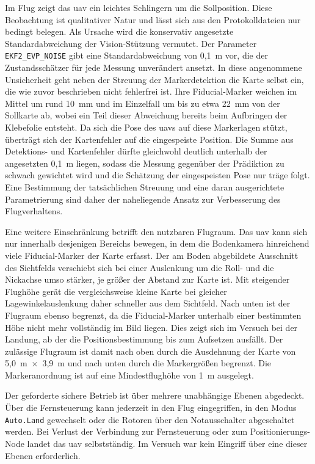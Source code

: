Im Flug zeigt das \gls{uav} ein leichtes Schlingern um die Sollposition.
Diese Beobachtung ist qualitativer Natur und lässt sich aus den Protokolldateien nur bedingt belegen.
Als Ursache wird die konservativ angesetzte Standardabweichung der Vision-Stützung vermutet.
Der Parameter \texttt{EKF2\_EVP\_NOISE} gibt eine Standardabweichung von 0,1~m vor, die der Zustandsschätzer für jede Messung unverändert ansetzt.
In diese angenommene Unsicherheit geht neben der Streuung der Markerdetektion die Karte selbst ein, die wie zuvor beschrieben nicht fehlerfrei ist.
Ihre Fiducial-Marker weichen im Mittel um rund 10~mm und im Einzelfall um bis zu etwa 22~mm von der Sollkarte ab, wobei ein Teil dieser Abweichung bereits beim Aufbringen der Klebefolie entsteht.
Da sich die Pose des \gls{uav}s auf diese Markerlagen stützt, überträgt sich der Kartenfehler auf die eingespeiste Position.
Die Summe aus Detektions- und Kartenfehler dürfte gleichwohl deutlich unterhalb der angesetzten 0,1~m liegen, sodass die Messung gegenüber der Prädiktion zu schwach gewichtet wird und die Schätzung der eingespeisten Pose nur träge folgt.
Eine Bestimmung der tatsächlichen Streuung und eine daran ausgerichtete Parametrierung sind daher der naheliegende Ansatz zur Verbesserung des Flugverhaltens.

Eine weitere Einschränkung betrifft den nutzbaren Flugraum.
Das \gls{uav} kann sich nur innerhalb desjenigen Bereichs bewegen, in dem die Bodenkamera hinreichend viele Fiducial-Marker der Karte erfasst.
Der am Boden abgebildete Ausschnitt des Sichtfelds verschiebt sich bei einer Auslenkung um die Roll- und die Nickachse umso stärker, je größer der Abstand zur Karte ist.
Mit steigender Flughöhe gerät die vergleichsweise kleine Karte bei gleicher Lagewinkelauslenkung daher schneller aus dem Sichtfeld.
Nach unten ist der Flugraum ebenso begrenzt, da die Fiducial-Marker unterhalb einer bestimmten Höhe nicht mehr vollständig im Bild liegen.
Dies zeigt sich im Versuch bei der Landung, ab der die Positionsbestimmung bis zum Aufsetzen ausfällt.
Der zulässige Flugraum ist damit nach oben durch die Ausdehnung der Karte von 5,0~m~$\times$~3,9~m und nach unten durch die Markergrößen begrenzt.
Die Markeranordnung ist auf eine Mindestflughöhe von 1~m ausgelegt.

Der geforderte sichere Betrieb ist über mehrere unabhängige Ebenen abgedeckt.
Über die Fernsteuerung kann jederzeit in den Flug eingegriffen, in den Modus \texttt{Auto.Land} gewechselt oder die Rotoren über den Notausschalter abgeschaltet werden.
Bei Verlust der Verbindung zur Fernsteuerung oder zum Positionierungs-Node landet das \gls{uav} selbstständig.
Im Versuch war kein Eingriff über eine dieser Ebenen erforderlich.




